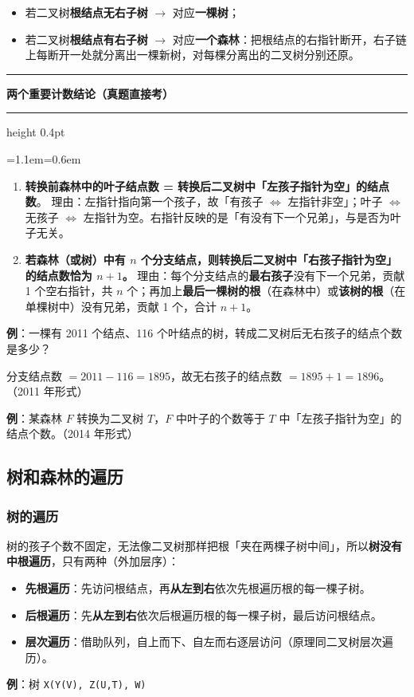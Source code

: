 \documentclass[11pt,openany,UTF8]{ctexbook}
\newcommand{\callouthead}[2]{%
  \par\addvspace{7pt}\noindent
  {\color{#1}\rule[-0.15em]{3pt}{1.05em}}\hspace{0.5em}%
  {\bfseries\color{#1}#2}\par\nobreak\vspace{-0.35em}%
  {\color{rulesep}\hrule height 0.4pt}\nobreak\vspace{0.45em}%
  \begingroup\small\setlength{\parindent}{0pt}%
  \leftskip=1.1em\rightskip=0.6em\noindent\ignorespaces}
\newcommand{\calloutend}{\par\endgroup\addvspace{7pt}}
\newenvironment{callkey}[1]{\callouthead{keybar}{#1}}{\calloutend}
\begin{document}
\begin{itemize}
\item 若二叉树\textbf{根结点无右子树} $\to$ 对应\textbf{一棵树}；
\item 若二叉树\textbf{根结点有右子树} $\to$ 对应\textbf{一个森林}：把根结点的右指针断开，右子链上每断开一处就分离出一棵新树，对每棵分离出的二叉树分别还原。
\end{itemize}
\begin{callkey}{两个重要计数结论（真题直接考）}
\begin{enumerate}
\item \textbf{转换前森林中的叶子结点数 = 转换后二叉树中「左孩子指针为空」的结点数}。 理由：左指针指向第一个孩子，故「有孩子 $\Leftrightarrow$ 左指针非空」；叶子 $\Leftrightarrow$ 无孩子 $\Leftrightarrow$ 左指针为空。右指针反映的是「有没有下一个兄弟」，与是否为叶子无关。
\item \textbf{若森林（或树）中有 $n$ 个分支结点，则转换后二叉树中「右孩子指针为空」的结点数恰为 $n+1$。} 理由：每个分支结点的\textbf{最右孩子}没有下一个兄弟，贡献 1 个空右指针，共 $n$ 个；再加上\textbf{最后一棵树的根}（在森林中）或\textbf{该树的根}（在单棵树中）没有兄弟，贡献 1 个，合计 $n+1$。
\end{enumerate}
\end{callkey}

\textbf{例}：一棵有 2011 个结点、116 个叶结点的树，转成二叉树后无右孩子的结点个数是多少？

分支结点数 $=2011-116=1895$，故无右孩子的结点数 $=1895+1=1896$。（2011 年形式）

\textbf{例}：某森林 $F$ 转换为二叉树 $T$，$F$ 中叶子的个数等于 $T$ 中「左孩子指针为空」的结点个数。（2014 年形式）

\subsection{树和森林的遍历}

\subsubsection{树的遍历}

树的孩子个数不固定，无法像二叉树那样把根「夹在两棵子树中间」，所以\textbf{树没有中根遍历}，只有两种（外加层序）：

\begin{itemize}
\item \textbf{先根遍历}：先访问根结点，再\textbf{从左到右}依次先根遍历根的每一棵子树。
\item \textbf{后根遍历}：先\textbf{从左到右}依次后根遍历根的每一棵子树，最后访问根结点。
\item \textbf{层次遍历}：借助队列，自上而下、自左而右逐层访问（原理同二叉树层次遍历）。
\end{itemize}
\textbf{例}：树 \texttt{X(Y(V)\allowbreak{},\allowbreak{} Z(U,\allowbreak{}T)\allowbreak{},\allowbreak{} W)\allowbreak{}}
\end{document}
